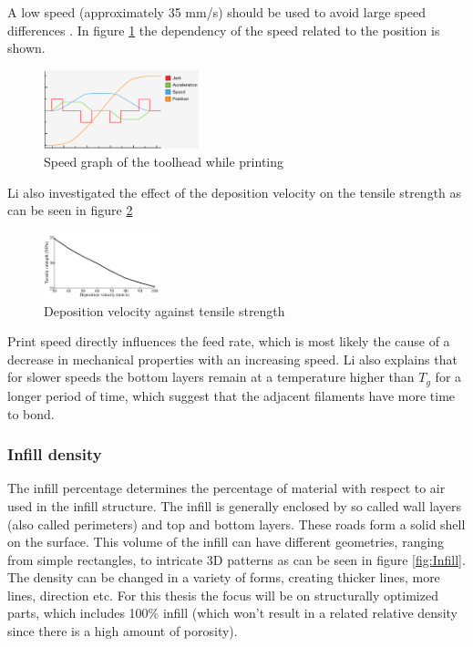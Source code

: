 A low speed (approximately 35 mm/s) should be used to avoid large speed differences \cite{Li2017TheProperties}.  In figure \ref{fig:speedgraph} the dependency of the speed related to the position is shown.

\begin{figure}[H]
    \centering
    \includegraphics[width=0.4\textwidth]{chapter_2/figures/Speedgraph.PNG}
    \caption{Speed graph of the toolhead while printing \cite{UltimakerSpeed}}
    \label{fig:speedgraph}
\end{figure}

Li \cite{Li2017TheProperties} also investigated the effect of the deposition velocity on the tensile strength as can be seen in figure \ref{fig:depositionspeed}

\begin{figure}[H]
    \centering
    \includegraphics[width=0.3\textwidth]{chapter_2/figures/depostionspeed.PNG}
    \caption{Deposition velocity against tensile strength \cite{Li2017TheProperties}}
    \label{fig:depositionspeed}
\end{figure}

Print speed directly influences the feed rate, which is most likely the cause of a decrease in mechanical properties with an increasing speed. Li also explains that for slower speeds the bottom layers remain at a temperature higher than $T_g$ for a longer period of time, which suggest that the adjacent filaments have more time to bond.

\subsubsection{Infill density}
The infill percentage determines the percentage of material with respect to air used in the infill structure. The infill is generally enclosed by so called wall layers (also called perimeters) and top and bottom layers. These roads form a solid shell on the surface. This volume of the infill can have different geometries, ranging from simple rectangles, to intricate 3D patterns as can be seen in figure \ref{fig:Infill}. The density can be changed in a variety of forms, creating thicker lines, more lines, direction etc. For this thesis the focus will be on structurally optimized parts, which includes 100\% infill (which won't result in a related relative density since there is a high amount of porosity).

